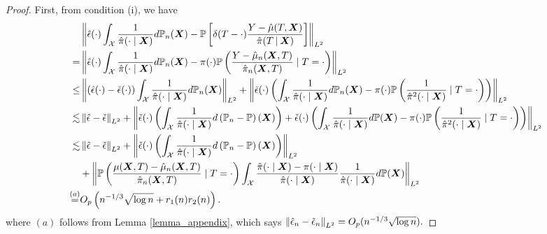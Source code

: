 \begin{proof}

First, from condition (i), we have
\begin{equation}\label{eq_appendix:thm2_eq1}
\begin{split}
&\left\|\hat\epsilon(\cdot)\int_{\mathcal{X}}\frac{1}{\hat\pi(\cdot\mid\boldsymbol{X})}d\mathbb{P}_n(\boldsymbol{X})-\mathbb{P}\left[\delta(T-\cdot)\frac{Y-\hat \mu(T,\boldsymbol{X})}{\hat \pi(T\,|\:\boldsymbol{X})}\right]\right\|_{L^2}
\\=&\left\|\hat\epsilon(\cdot)\int_{\mathcal{X}}\frac{1}{\hat\pi(\cdot\mid\boldsymbol{X})}d\mathbb{P}_n(\boldsymbol{X})-\pi(\cdot)\mathbb{P}\left(\frac{Y-\hat \mu_n(\boldsymbol{X},T)}{\hat\pi_n(\boldsymbol{X},T)}\mid T=\cdot\right)\right\|_{L^2}
\\\leq&
\left\|(\hat\epsilon(\cdot)-\check\epsilon(\cdot))\int_{\mathcal{X}}\frac{1}{\hat\pi(\cdot\mid\boldsymbol{X})}d\mathbb{P}_n(\boldsymbol{X})\right\|_{L^2}+\left\|\check\epsilon(\cdot)\left(\int_{\mathcal{X}}\frac{1}{\hat\pi(\cdot\mid\boldsymbol{X})}d\mathbb{P}_n(\boldsymbol{X})-\pi(\cdot)\mathbb{P}\left(\frac{1}{\hat\pi^2(\cdot\mid\boldsymbol{X})}\mid T=\cdot\right)\right)\right\|_{L^2}
\\\stackrel{}{\lesssim}&
\left\|\hat\epsilon-\check\epsilon\right\|_{L^2}
+\left\|\check\epsilon(\cdot)\left(\int_{\mathcal{X}}\frac{1}{\hat\pi(\cdot\mid\boldsymbol{X})}d\left(\mathbb{P}_n-\mathbb{P}\right)(\boldsymbol{X})\right)
+\check\epsilon(\cdot)\left(\int_{\mathcal{X}}\frac{1}{\hat\pi(\cdot\mid\boldsymbol{X})}d\mathbb{P}(\boldsymbol{X})-\pi(\cdot)\mathbb{P}\left(\frac{1}{\hat\pi^2(\cdot\mid\boldsymbol{X})}\mid T=\cdot\right)\right)\right\|_{L^2}
\\\stackrel{}{\lesssim}&
\left\|\hat\epsilon-\check\epsilon\right\|_{L^2}
+\left\|\check\epsilon(\cdot)\left(\int_{\mathcal{X}}\frac{1}{\hat\pi(\cdot\mid\boldsymbol{X})}d\left(\mathbb{P}_n-\mathbb{P}\right)(\boldsymbol{X})\right)\right\|_{L^2}
\\&+\left\|\mathbb{P}\left(\frac{\mu(\boldsymbol{X},T)-\hat \mu_n(\boldsymbol{X},T)}{\hat\pi_n(\boldsymbol{X},T)}\mid T=\cdot\right)\int_{\mathcal{X}}\frac{\hat\pi(\cdot\mid\boldsymbol{X})-\pi(\cdot\mid\boldsymbol{X})}{\hat\pi(\cdot\mid\boldsymbol{X})}\frac{1}{\hat\pi(\cdot\mid\boldsymbol{X})}d\mathbb{P}(\boldsymbol{X})\right\|_{L^2}
\\\stackrel{(a)}{=}& O_p\left(n^{-1/3}\sqrt{\log n}+r_1(n)r_2(n)\right).
\end{split}
\end{equation}
where $(a)$ follows from Lemma \ref{lemma_appendix}, which says
$
\left\|\hat \epsilon_n-\check\epsilon_n\right\|_{L^2}
=O_p(n^{-1/3}\sqrt{\log n}).
$


\end{proof}
